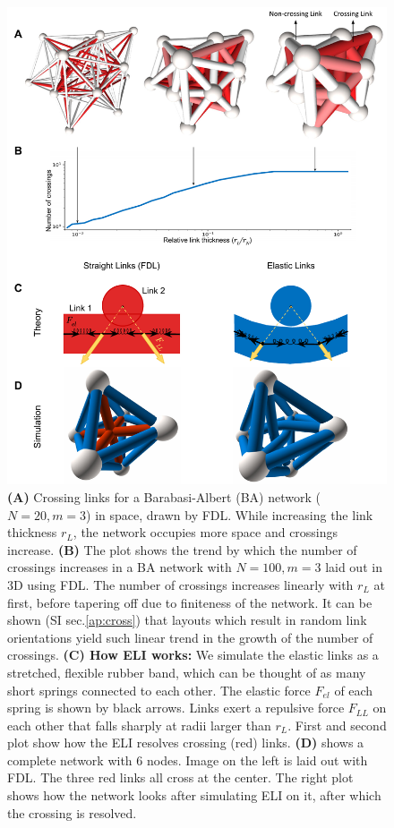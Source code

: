 \documentclass[nofootinbib,preprint,floatfix,titlepage,superscriptaddress]{revtex4} %
\begin{document}
{\begin{figure}
{    }     
    \label{fig:crossings}
\end{figure}
\begin{figure}
    \vspace{4cm}
    \centering
    \includegraphics[width=.9\columnwidth]{fig-09-19/crs-resolve-0617.pdf}
    \caption{\scriptsize
    {\bf (A)}  Crossing links for a Barabasi-Albert (BA) network ($N = 20, m = 3$) in space, drawn by FDL. While increasing the link thickness $r_L$, the network occupies more space and crossings increase. 
    {\bf (B)} The plot shows the trend by which the number of crossings increases in a BA network with $N=100, m =3$ laid out in 3D using FDL.
    The number of crossings increases linearly with $r_L$ at first, before tapering off due to finiteness of the network. It can be shown (SI sec.\ref{ap:cross}) that layouts which result in random link orientations yield such linear trend in the growth of the number of crossings.
    {\bf(C) How ELI works:} We simulate the elastic links as a stretched, flexible rubber band, which can be thought of as many short springs connected to each other. 
    The elastic force $F_{el}$ of each spring is shown by black arrows.
    Links exert a repulsive force $F_{LL}$  on each other that falls sharply at radii larger than $r_L$. 
    First and second plot show how the ELI resolves crossing (red) links. {\bf(D)} shows a complete network with 6 nodes. Image on the left is laid out with FDL. The three red links all cross at the center. The right plot shows how the network looks after simulating ELI on it, after which the crossing is resolved. 
    }     
    \label{fig:crossings}
\end{figure}
} %
\end{document}
